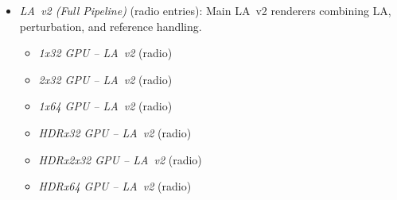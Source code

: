 \begin{itemize}
\begin{itemize}
\begin{itemize}
          \item \emph{Perturbation Only} (submenu): Reference-compressed perturbation-only variants.
            \begin{itemize}
              \item \emph{1x32 GPU -- RC Perturb Only} (radio)
              \item \emph{2x32 GPU -- RC Perturb Only} (radio)
              \item \emph{1x64 GPU -- RC Perturb Only} (radio)
              \item \emph{HDRx32 GPU -- RC Perturb Only} (radio)
              \item \emph{HDRx2x32 GPU -- RC Perturb Only} (radio)
              \item \emph{HDRx64 GPU -- RC Perturb Only} (radio)
            \end{itemize}

          \item \emph{LA Only} (submenu): Reference-compressed LA-only variants.
            \begin{itemize}
              \item \emph{1x32 GPU -- RC LA~v2 -- LA only} (radio)
              \item \emph{2x32 GPU -- RC LA~v2 -- LA only} (radio)
              \item \emph{1x64 GPU -- RC LA~v2 -- LA only} (radio)
              \item \emph{HDRx32 GPU -- RC LA~v2 -- LA only} (radio)
              \item \emph{HDRx2x32 GPU -- RC LA~v2 -- LA only} (radio)
              \item \emph{HDRx64 GPU -- RC LA~v2 -- LA only} (radio)
            \end{itemize}
        \end{itemize}

      \item \emph{LA~v2 (Full Pipeline)} (radio entries): Main LA~v2 renderers combining LA, perturbation, and reference handling.
        \begin{itemize}
          \item \emph{1x32 GPU -- LA~v2} (radio)
          \item \emph{2x32 GPU -- LA~v2} (radio)
          \item \emph{1x64 GPU -- LA~v2} (radio)
          \item \emph{HDRx32 GPU -- LA~v2} (radio)
          \item \emph{HDRx2x32 GPU -- LA~v2} (radio)
          \item \emph{HDRx64 GPU -- LA~v2} (radio)
        \end{itemize}


\end{itemize}
\end{itemize}
